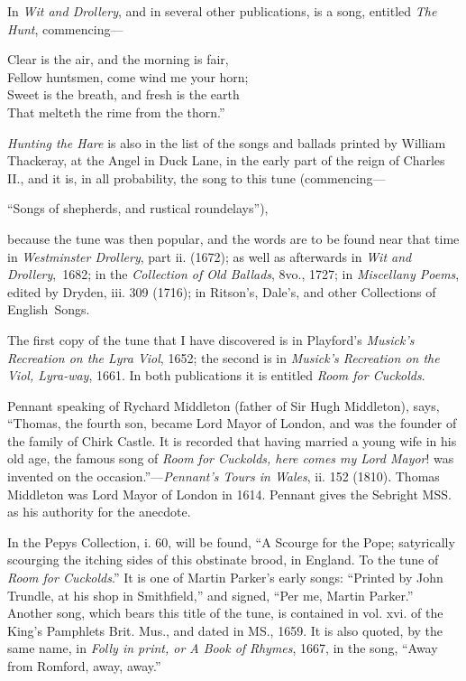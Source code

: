 In \textit{Wit and Drollery}, and in several other publications, is a song, entitled
\textit{The Hunt}, commencing—
\settowidth{\versewidth}{Sweet is the breath, and fresh is the earth}
\begin{scverse}
\begin{altverse}
Clear is the air, and the morning is fair,\\
Fellow huntsmen, come wind me your horn;\\
Sweet is the breath, and fresh is the earth\\
That melteth the rime from the thorn.”
\end{altverse}
\end{scverse}
\textit{Hunting the Hare} is also in the list of the songs and ballads printed by William
Thackeray, at the Angel in Duck Lane, in the early part of the reign of
Charles II., and it is, in all probability, the song to this tune (commencing—
\settowidth{\versewidth}{“Songs of shepherds, and rustical roundelays”),}
\begin{scverse}
“Songs of shepherds, and rustical roundelays”),
\end{scverse}
because the tune was then popular, and the words are to be found near that time
in \textit{Westminster Drollery}, part ii. (1672); as well as afterwards in \textit{Wit and
Drollery},~1682; in the \textit{Collection of Old Ballads}, 8vo., 1727; in \textit{Miscellany
Poems}, edited by Dryden, iii. 309 (1716); in Ritson’s, Dale’s, and other
Collections of English~Songs.

The first copy of the tune that I have discovered is in Playford’s \textit{Musick’s
Recreation on the Lyra Viol}, 1652; the second is in \textit{Musick’s Recreation on the
Viol, Lyra-way}, 1661. In both publications it is entitled \textit{Room for Cuckolds}.

Pennant speaking of Rychard Middleton (father of Sir Hugh Middleton), says,
“Thomas, the fourth son, became Lord Mayor of London, and was the founder of
the family of Chirk Castle. It is recorded that having married a young wife in
his old age, the famous song of \textit{Room for Cuckolds, here comes my Lord Mayor}!
was invented on the occasion.”—\textit{Pennant’s Tours in Wales}, ii. 152 (1810).
Thomas Middleton was Lord Mayor of London in 1614. Pennant gives the
Sebright MSS. as his authority for the anecdote.

In the Pepys Collection, i. 60, will be found, “A Scourge for the Pope;
satyrically scourging the itching sides of this obstinate brood, in England. To
the tune of \textit{Room for Cuckolds}.” It is one of Martin Parker’s early songs:
“Printed by John Trundle, at his shop in Smithfield,” and signed, “Per me,
Martin Parker.” Another song, which bears this title of the tune, is contained
in vol. xvi. of the King’s Pamphlets Brit. Mus., and dated in MS., 1659. It is
also quoted, by the same name, in \textit{Folly in print, or A Book of Rhymes}, 1667, in
the song, “Away from Romford, away, away.”

